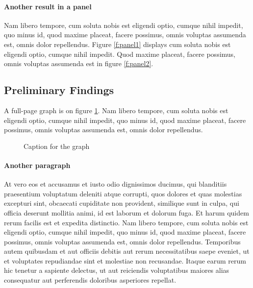 \documentclass[letterpaper,12pt,leqno]{article}
\newcommand{\pdf}{figures.pdf}
\begin{document}
\paragraph{Another result in a panel} Nam libero tempore, cum soluta nobis est eligendi optio, cumque nihil impedit, quo minus id, quod maxime placeat, facere possimus, omnis voluptas assumenda est, omnis dolor repellendus. Figure \ref{f:panel1} displays cum soluta nobis est eligendi optio, cumque nihil impedit. Quod maxime placeat, facere possimus, omnis voluptas assumenda est in figure \ref{f:panel2}.

\subsection{Preliminary Findings}

A full-page graph is on figure \ref{f:graph2}. Nam libero tempore, cum soluta nobis est eligendi optio, cumque nihil impedit, quo minus id, quod maxime placeat, facere possimus, omnis voluptas assumenda est, omnis dolor repellendus.

\begin{figure}[p]
\hfill
{}\vfig
{}\hfill
{}\vfig
{}\hfill
{}
\caption{Caption for the graph}
\label{f:graph2}\end{figure}


\paragraph{Another paragraph} At vero eos et accusamus et iusto odio dignissimos ducimus, qui blanditiis praesentium voluptatum deleniti atque corrupti, quos dolores et quas molestias excepturi sint, obcaecati cupiditate non provident, similique sunt in culpa, qui officia deserunt mollitia animi, id est laborum et dolorum fuga. Et harum quidem rerum facilis est et expedita distinctio. Nam libero tempore, cum soluta nobis est eligendi optio, cumque nihil impedit, quo minus id, quod maxime placeat, facere possimus, omnis voluptas assumenda est, omnis dolor repellendus. Temporibus autem quibusdam et aut officiis debitis aut rerum necessitatibus saepe eveniet, ut et voluptates repudiandae sint et molestiae non recusandae. Itaque earum rerum hic tenetur a sapiente delectus, ut aut reiciendis voluptatibus maiores alias consequatur aut perferendis doloribus asperiores repellat. 
\end{document}
